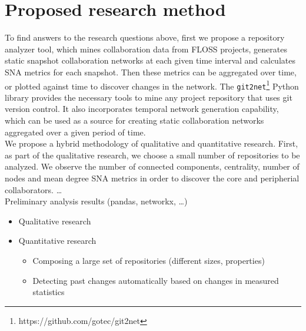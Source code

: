 \section{Proposed research method}
To find answers to the research questions above, first we propose a repository analyzer tool, which mines collaboration data from FLOSS projects, generates static snapshot collaboration networks at each given time interval and calculates SNA metrics for each snapshot. Then these metrics can be aggregated over time, or plotted against time to discover changes in the network. The \texttt{git2net}\footnote{https://github.com/gotec/git2net} \cite{goteAnalysingTimeStampedCoEditing2019} Python library provides the necessary tools to mine any project repository that uses git version control. It also incorporates temporal network generation capability, which can be used as a source for creating static collaboration networks aggregated over a given period of time. \\

We propose a hybrid methodology of qualitative and quantitative research. First, as part of the qualitative research, we choose a small number of repositories to be analyzed. We observe the number of connected components, centrality, number of nodes and mean degree SNA metrics in order to discover the core and peripherial collaborators. \dots \\

Preliminary analysis results (pandas, networkx, \dots)

\begin{itemize}
    \item Qualitative research
    \item Quantitative research
    \begin{itemize}
        \item Composing a large set of repositories (different sizes, properties)
        \item Detecting past changes automatically based on changes in measured statistics
    \end{itemize}
\end{itemize}

